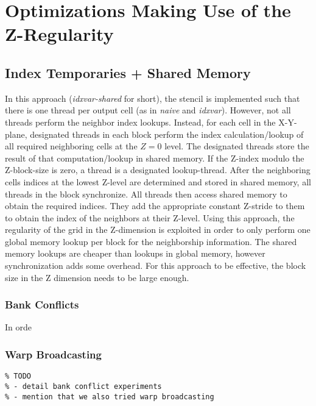 \section{Optimizations Making Use of the Z-Regularity}

\subsection{Index Temporaries + Shared Memory} In this approach (\emph{idxvar-shared} for short), the stencil is implemented such that there is one thread per output cell (as in \emph{naive} and \emph{idxvar}). However, not all threads perform the neighbor index lookups. Instead, for each cell in the X-Y-plane, designated threads in each block perform the index calculation/lookup of all required neighboring cells at the $Z=0$ level. The designated threads store the result of that computation/lookup in shared memory. If the Z-index modulo the Z-block-size is zero, a thread is a designated lookup-thread. After the neighboring cells indices at the lowest Z-level are determined and stored in shared memory, all threads in the block synchronize. All threads then access shared memory to obtain the required indices. They add the appropriate constant Z-stride to them to obtain the index of the neighbors at their Z-level. Using this approach, the regularity of the grid in the Z-dimension is exploited in order to only perform one global memory lookup per block for the neighborship information. The shared memory lookups are cheaper than lookups in global memory, however synchronization adds some overhead. For this approach to be effective, the block size in the Z dimension needs to be large enough.

\subsubsection{Bank Conflicts}

In orde

\subsubsection{Warp Broadcasting}

\begin{verbatim}
% TODO
% - detail bank conflict experiments
% - mention that we also tried warp broadcasting
\end{verbatim}


